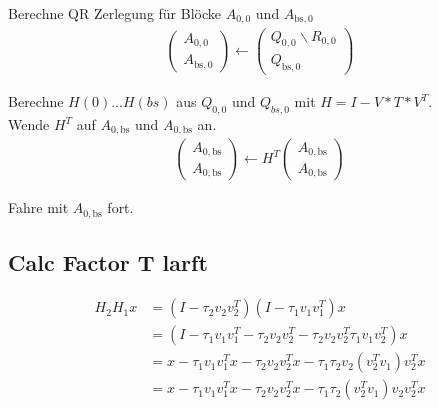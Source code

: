 Berechne QR Zerlegung für Blöcke $A_{0, 0}$ und $ A_{\text{bs},0}$
\begin{align}
	\left(\begin{array}{l} 
	A_{0, 0} \\ \hline
	A_{\text{bs}, 0}
	\end{array}\right)
	\leftarrow
	\left(\begin{array}{l} 
	Q_{0, 0}  \backslash R_{0,0} \\ \hline
	Q_{\text{bs}, 0} 
	\end{array}\right)
\end{align}

Berechne $H(0)$...$H(bs)$ aus $Q_{0, 0}$ und $Q_{bs, 0}$ mit $H = I - V*T*V^T$.\\
Wende $H^T$ auf $A_{0, \text{bs}}$ und $ A_{0,\text{bs}}$ an.
\begin{align}
	\left(\begin{array}{l} 
	A_{0, \text{bs}} \\ \hline
	A_{0, \text{bs}}
	\end{array}\right)
	\leftarrow
	H^T \left(\begin{array}{l} 
	A_{0, \text{bs}} \\ \hline
	A_{0, \text{bs}}
	\end{array}\right)
\end{align}



Fahre mit $A_{0, \text{bs}}$ fort.

\subsection{Calc Factor T larft}
\cite{Joffrain:2006:AHT:1141885.1141886}

\begin{align*}
	H_2 H_1 x &= (I-\tau_2 v_2 v_2^T)(I-\tau_1 v_1 v_1^T)x\\
	&= (I - \tau_1 v_1 v_1^T - \tau_2 v_2 v_2^T - \tau_2 v_2 v_2^T \tau_1 v_1 v_2^T) x\\
  &= x - \tau_1 v_1 v_1^T x - \tau_2 v_2 v_2^T x - \tau_1 \tau_2 v_2 (v_2^T v_1 )v_2^T x\\
  &= x - \tau_1 v_1 v_1^T x - \tau_2 v_2 v_2^T x - \tau_1 \tau_2 (v_2^T v_1 ) v_2 v_2^T x\\
\end{align*}

